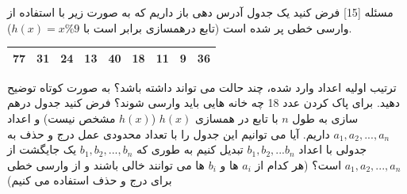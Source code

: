 ‌مسئله [15]
فرض کنید یک جدول آدرس دهی باز داریم که به صورت زیر با استفاده از وارسی خطی پر شده است (تابع درهمسازی برابر است با
$h(x) = x \% 9$).



\begin{center}
\begin{tabular}{|c|c|c|c|c|c|c|c|c|}
	\hline
	77 & 31 & 24 & 13 & 40 & 18 & 11 & 9 & 36 \\
	\hline
\end{tabular}
\end{center}
 ترتیب اولیه اعداد وارد شده، چند حالت می تواند داشته باشد؟ به صورت کوتاه توضیح دهید.
 برای پاک کردن عدد 18 چه خانه هایی باید وارسی شوند؟
 فرض کنید جدول درهم سازی به طول $n$ با تابع در همسازی 
$h(x)$
($h(x)$
مشخص نیست) و اعداد 
$a_1,a_2,...,a_n$
داریم. آیا می توانیم این جدول را با تعداد محدودی عمل درج و حذف به جدولی با اعداد 
$b_1,b_2,...b_n$
تبدیل کنیم به طوری که 
$b_1,b_2,...,b_n$
یک جایگشت از 
$a_1,a_2,...,a_n$
است؟
(هر کدام از $a_i$ ها و $b_i$ ها می توانند خالی باشند و از وارسی خطی برای درج و حذف استفاده می کنیم) 









